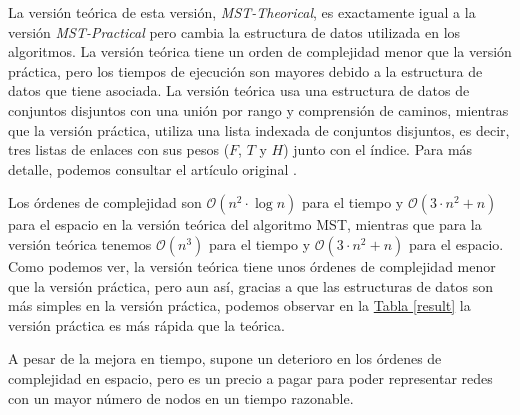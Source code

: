 \documentclass[paper=a4, fontsize=11pt]{article} %
\numberwithin{equation}{section} %
\numberwithin{figure}{section} %
\numberwithin{table}{section} %
\begin{document}
La versión teórica de esta versión, \textit{MST-Theorical}, es exactamente igual a la versión \textit{MST-Practical} pero cambia la estructura de datos utilizada en los algoritmos. La versión teórica tiene un orden de complejidad menor que la versión práctica, pero los tiempos de ejecución son mayores debido a la estructura de datos que tiene asociada. La versión teórica usa una estructura de datos de conjuntos disjuntos con una unión por rango y comprensión de caminos, mientras que la versión práctica, utiliza una lista indexada de conjuntos disjuntos, es decir, tres listas de enlaces con sus pesos ($F$, $T$ y $H$) junto con el índice. Para más detalle, podemos consultar el artículo original \cite{alg}.

Los órdenes de complejidad son $\mathcal{O}(n^2\cdot\log n)$ para el tiempo y $\mathcal{O}(3\cdot n^2+n)$ para el espacio en la versión teórica del algoritmo MST, mientras que para la versión teórica tenemos $\mathcal{O}(n^3)$ para el tiempo y $\mathcal{O}(3\cdot n^2+n)$ para el espacio. Como podemos ver, la versión teórica tiene unos órdenes de complejidad menor que la versión práctica, pero aun así, gracias a que las estructuras de datos son más simples en la versión práctica, podemos observar en la \hyperref[result]{Tabla \ref*{result}} la versión práctica es más rápida que la teórica.

A pesar de la mejora en tiempo, supone un deterioro en los órdenes de complejidad en espacio, pero es un precio a pagar para poder representar redes con un mayor número de nodos en un tiempo razonable.
\end{document}
